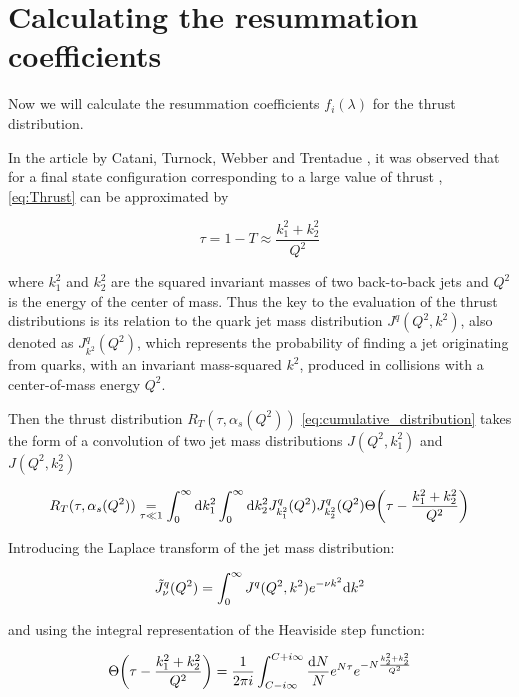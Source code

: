 \documentclass[../main.tex]{subfiles}
\begin{document}
\section{Calculating the resummation coefficients}\label{sec:f_coeff}

Now we will calculate the resummation coefficients $f_i(\lambda)$ for the thrust distribution.

In the article by Catani, Turnock, Webber and Trentadue \cite{CATANI1991491}, it was observed that 
for a final state configuration corresponding to a large value of thrust , \cref{eq:Thrust} can be approximated by

\begin{equation}
    \tau = 1-T \approx \frac{k_1^2+k_2^2}{Q^2}
\end{equation}

where $k_1^2$ and $k_2^2$ are the squared invariant masses of two back-to-back jets and $Q^2$ is the energy of the center of mass.
Thus the key to the evaluation of the thrust distributions is its relation to the quark jet mass distribution $J^q(Q^2,k^2)$, also denoted as $J^q_{k^2}(Q^2)$, which represents
the probability of finding a jet originating from quarks, with an invariant mass-squared $k^2$, produced in collisions with a center-of-mass energy $Q^2$.

Then the thrust distribution $R_T(\tau,\alpha_s(Q^2))$ \cref{eq:cumulative_distribution}
takes the form of a convolution of two jet mass distributions $J(Q^2,k_1^2)$ and $J(Q^2,k_2^2)$

\begin{equation}\label{eq:Thrust fraction convolution}
    R_T(\tau,\alpha_s(Q^2)) \underset{\tau \ll 1}{=} \int_0^\infty \dd k_1^2 \int_0^\infty  \dd k_2^2 J^q_{k_1^2}(Q^2) J^q_{k_2^2}(Q^2) \Theta\qty(\tau - \frac{k_1^2+k_2^2}{Q^2}) 
\end{equation}

Introducing the Laplace transform of the jet mass distribution:

\begin{equation}\label{eq:laplace_jet_mass}
    \Tilde{J}^q_\nu(Q^2) = \int_0^\infty J^q(Q^2,k^2) e^{-\nu k^2} \dd k^2 
\end{equation}

and using the integral representation of the Heaviside step function:

\begin{equation} \label{eq:heaviside_integral_representation}
    \Theta\qty(\tau - \frac{k_1^2+k_2^2}{Q^2}) = \frac{1}{2\pi i} \int_{C-i\infty}^{C+i\infty} \frac{\dd N}{N} e^{N \tau} e^{- N \frac{k_2^2+k_2^2}{Q^2}} 
\end{equation}
\end{document}
